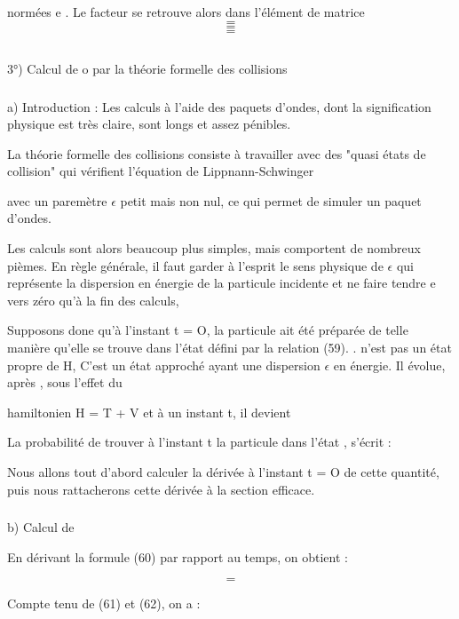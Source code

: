 normées e . Le facteur  se retrouve alors dans l'élément de
matrice
\[
\tag{59}=
\]
\[
\tag{60}=
\]
\[
\tag{61}=
\]

\subsection{}%
3°) Calcul de o par la théorie formelle des collisions

\subsubsection{}%
a) Introduction : Les calculs à l'aide des paquets d'ondes,
dont la signification physique est très claire, sont longs et assez pénibles.

La théorie formelle des collisions consiste à travailler avec
des "quasi états de collision"  qui vérifient l'équation de
Lippnann-Schwinger

avec un paremètre $\epsilon$ petit mais non nul, ce qui permet de simuler un paquet
d'ondes.

Les calculs sont alors beaucoup plus simples, mais comportent de
nombreux pièmes. En règle générale, il faut garder à l'esprit le sens physique
de $\epsilon$ qui représente la dispersion en énergie de la particule incidente
et ne faire tendre e vers zéro qu'à la fin des calculs,

Supposons done qu'à l'instant t = O, la particule ait été préparée
de telle manière qu'elle se trouve dans l'état  défini par la relation (59). .
n'est pas un état propre de H, C'est un état approché
ayant une dispersion $\epsilon$ en énergie. Il évolue, après , sous l'effet du

hamiltonien H = T + V et à un instant t, il devient

La probabilité de trouver à l'instant t la particule dans l'état ,
 s'écrit :


Nous allons tout d'abord calculer la dérivée à l'instant t = O de cette
quantité, puis nous rattacherons cette dérivée à la section efficace.

 

\subsubsection{}%
b) Calcul de 

En dérivant la formule (60) par rapport au temps, on obtient :

\[
\tag{62}=
\]

Compte tenu de (61) et (62), on a :

